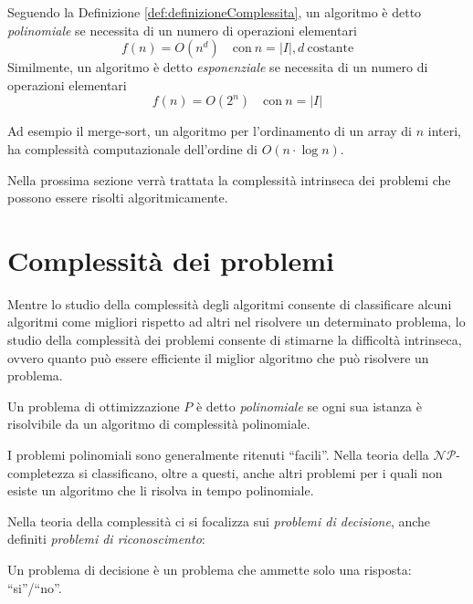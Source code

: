 Seguendo la Definizione \ref{def:definizioneComplessita}, un algoritmo è detto 
\emph{polinomiale} se necessita di un numero di operazioni elementari
\begin{displaymath}
 f(n) = O(n^d) \quad \text{con}\  n = \vert I \vert, d\  \text{costante}
\end{displaymath}
Similmente, un algoritmo è detto \emph{esponenziale} se necessita di un numero di 
operazioni elementari
\begin{displaymath}
 f(n) = O(2^n) \quad \text{con}\ n = \vert I \vert
\end{displaymath}

Ad esempio il merge-sort, un algoritmo per l'ordinamento di un array di $n$ interi, ha 
complessità computazionale dell'ordine di $O(n\cdot \log n)$.

Nella prossima sezione verrà trattata la complessità intrinseca dei problemi che possono 
essere risolti algoritmicamente.

\section{Complessità dei problemi}
\label{sec:complessitaProblemi}
Mentre lo studio della complessità degli algoritmi consente di classificare alcuni 
algoritmi come migliori rispetto ad altri nel risolvere un determinato problema, lo 
studio della complessità dei problemi consente di stimarne la difficoltà intrinseca, 
ovvero quanto può essere efficiente il miglior algoritmo che può risolvere un problema.

\begin{mydef}
 Un problema di ottimizzazione $P$ è detto \emph{polinomiale} se ogni sua istanza è 
risolvibile da un algoritmo di complessità polinomiale.
\end{mydef}
I problemi polinomiali sono generalmente ritenuti ``facili''. Nella teoria della 
$\mathcal{NP}$-completezza si classificano, oltre a questi, anche altri problemi per i 
quali non esiste un algoritmo che li risolva in tempo polinomiale.


Nella teoria della complessità ci si focalizza sui \emph{problemi di decisione}, anche 
definiti \emph{problemi di riconoscimento}:
\begin{mydef}
 Un problema di decisione è un problema che ammette solo una risposta: ``si''/``no''.
\end{mydef}

